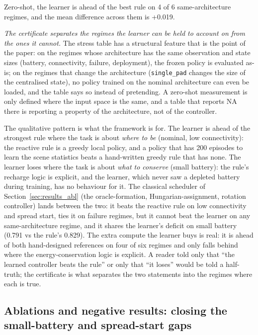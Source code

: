 \documentclass[conference]{IEEEtran}
\begin{document}
Zero-shot, the learner is ahead of the best rule on 4 of 6 same-architecture regimes, and the mean difference across them is +0.019.


\emph{The certificate separates the regimes the learner can be held to
account on from the ones it cannot.}  The stress table has a structural
feature that is the point of the paper: on the regimes whose architecture
has the same observation and state sizes (battery, connectivity, failure,
deployment), the frozen policy is evaluated as-is; on the regimes that
change the architecture (\texttt{single\_pad} changes the size of the
centralised state), no policy trained on the nominal architecture can even
be loaded, and the table says so instead of pretending.  A zero-shot
measurement is only defined where the input space is the same, and a table
that reports NA there is reporting a property of the architecture, not of
the controller.



The qualitative pattern is what the framework is for.  The learner is ahead
of the strongest rule where the task is about \emph{where to be} (nominal,
low connectivity): the reactive rule is a greedy local policy, and a policy
that has 200 episodes to learn the scene statistics beats a hand-written
greedy rule that has none.  The learner loses where the task is about
\emph{what to conserve} (small battery): the rule's recharge logic is
explicit, and the learner, which never saw a depleted battery during
training, has no behaviour for it.  The classical scheduler of Section~\ref{sec:results_abl}
(the oracle-formation, Hungarian-assignment, rotation controller) lands
between the two: it beats the reactive rule on low connectivity and spread
start, ties it on failure regimes, but it cannot beat the learner on any
same-architecture regime, and it shares the learner's deficit on small
battery (0.791 vs the rule's 0.829).  The extra compute the learner buys is
real: it is ahead of both hand-designed references on four of six regimes
and only falls behind where the energy-conservation logic is explicit.  A reader told only that ``the learned
controller beats the rule'' or only that ``it loses'' would be told a
half-truth; the certificate is what separates the two statements into the
regimes where each is true.


\subsection{Ablations and negative results: closing the small-battery and spread-start gaps}
\label{sec:results_innov}
\end{document}
